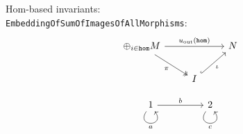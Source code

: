 \documentclass[12pt,compress]{beamer}
\begin{document}
\begin{frame}[fragile]
Hom-based invariants: \\
\texttt{EmbeddingOfSumOfImagesOfAllMorphisms}:
\[
\begin{tikzcd}
\displaystyle{\oplus_{i\in \mathtt{hom}} M} \arrow[rr, "u_{\text{out}}(\mathtt{hom})"] \arrow[rd, "\pi"', two heads] &                              & N \\
                                                                                                            & I \arrow[ru, "\iota"', hook] &  
\end{tikzcd}
\]
\end{frame}

\begin{frame}[fragile]
\[
\begin{tikzcd}
1 \arrow["a"', loop, distance=2em, in=305, out=235] \arrow[rr, "b"] &  & 2 \arrow["c"', loop, distance=2em, in=305, out=235]
\end{tikzcd}
\]
\end{frame}
\end{document}
